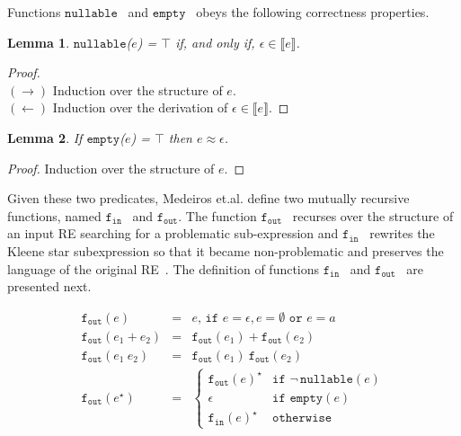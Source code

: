\documentclass[oneside,12pt]{scrbook}
\newtheorem{Lemma}{Lemma}
\theoremstyle{definition}
\newcommand{\sembrackets}[1]{\ensuremath{\llbracket #1 \rrbracket}}
\newcommand{\nullable}{\ensuremath{\texttt{nullable}}}
\newcommand{\emptyy}{\ensuremath{\texttt{empty}}}
\newcommand{\fin}{\ensuremath{\texttt{f$_{\texttt{in}}$}}}
\newcommand{\fout}{\ensuremath{\texttt{f$_{\texttt{out}}$}}}
\theoremstyle{plain}
\theoremstyle{definition}
\begin{document}
Functions \nullable~ and \emptyy~ obeys the following correctness properties.


\begin{Lemma}
	\nullable($e$) = $\top$ if, and only if, $\epsilon\in\sembrackets{e}$.
\end{Lemma}
\begin{proof}$\,$\\
	$(\to)$ Induction over the structure of $e$. \\$(\leftarrow)$ Induction over the derivation of $\epsilon \in\sembrackets{e}$.
\end{proof}

\begin{Lemma}
	If \emptyy($e$) = $\top$ then $e \approx \epsilon$.
\end{Lemma}
\begin{proof}
	Induction over the structure of $e$.
\end{proof}


Given these two predicates, Medeiros et.al. define two mutually recursive functions,
named \fin~ and \fout. The function \fout~ recurses over the structure of an input RE
searching for a problematic sub-expression and \fin~ rewrites the Kleene star subexpression
so that it became non-problematic and preserves the language of the original 
RE~\cite{Medeiros14}. The definition of functions \fin~ and \fout~ are presented next.

\[
\begin{array}{lcl}
\fout(e) & = & e,\,\texttt{if } e = \epsilon, e = \emptyset \texttt{ or } e = a\\
\fout(e_1 + e_2) & = & \fout(e_1) + \fout(e_2) \\
\fout(e_1\:e_2) & = & \fout(e_1)\:\fout(e_2)\\
\fout(e^\star) & = & \left\{
\begin{array}{ll}
\fout(e)^\star & \texttt{if } \neg\,\nullable(e)\\
\epsilon       & \texttt{if } \emptyy(e)\\
\fin(e)^\star  & \texttt{otherwise}
\end{array}
\right.
\end{array}
\]
\end{document}

